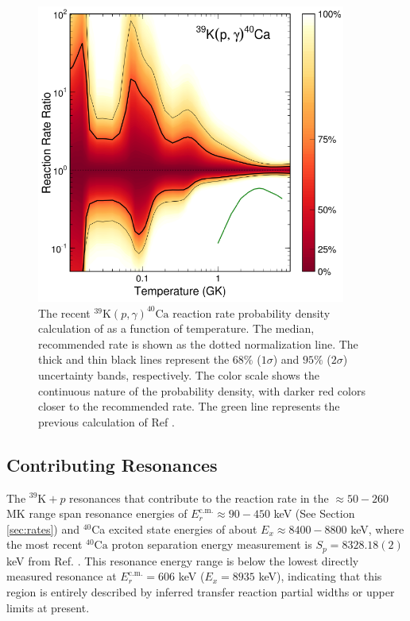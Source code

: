 \begin{figure}[t]
\centering
\includegraphics[width=4in]{Chapter-6/figs/39K_p_g_Longland2018.png}
\caption{\label{fig:39K_p_g_Longland}The recent $^{39}\mathrm{K}(p,\gamma)^{40}\mathrm{Ca}$ reaction rate probability density calculation of \cite{Longland2018} as a function of temperature. The median, recommended rate is shown as the dotted normalization line. The thick and thin black lines represent the $68\%$ ($1\sigma$) and $95\%$ ($2\sigma$) uncertainty bands, respectively. The color scale shows the continuous nature of the probability density, with darker red colors closer to the recommended rate. The green line represents the previous calculation of Ref \cite{Cheng1981}.}
\end{figure}

\subsection{Contributing Resonances}

The $^{39}\mathrm{K}+p$ resonances that contribute to the reaction rate in the $\approx50-260$ MK range span resonance energies of $E^{\mathrm{c.m.}}_{r} \approx 90-450$ keV (See Section \ref{sec:rates}) and $^{40}$Ca excited state energies of about $E_{x} \approx 8400-8800$ keV, where the most recent $^{40}\mathrm{Ca}$ proton separation energy measurement is $S_{p} = 8328.18(2)$ keV from Ref. \cite{Wang2021}. This resonance energy range is below the lowest directly measured resonance at $E^{\mathrm{c.m.}}_{r} = 606$ keV ($E_{x} = 8935$ keV), indicating that this region is entirely described by inferred transfer reaction partial widths or upper limits at present.

